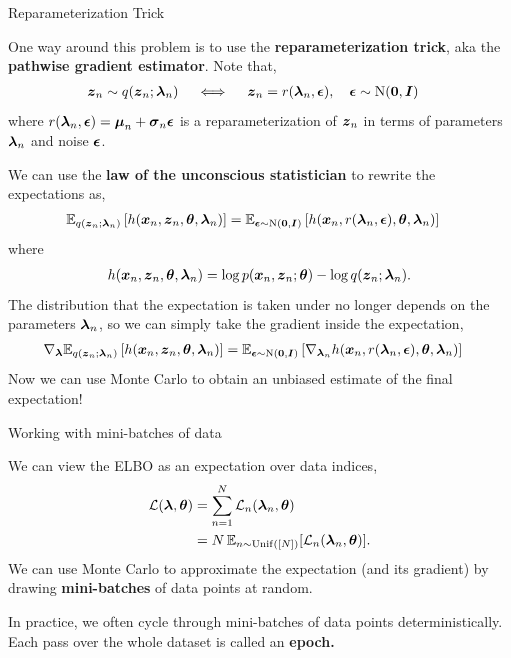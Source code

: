 \documentclass[aspectratio=169]{beamer}
\begin{document}
\begin{frame}[t,allowframebreaks]{Reparameterization Trick}\label{reparameterization-trick}

One way around this problem is to use the \textbf{reparameterization
trick}, aka the \textbf{pathwise gradient estimator}. Note that,
\begin{align*}
    \boldsymbol{z}_n \sim q(\boldsymbol{z}_n; \boldsymbol{\lambda}_n) \quad \iff \quad
    \boldsymbol{z}_n &= r(\boldsymbol{\lambda}_n, \boldsymbol{\epsilon}), \quad \boldsymbol{\epsilon} \sim \mathrm{N}(\boldsymbol{0}, \boldsymbol{I}) 
\end{align*} where
\(r(\boldsymbol{\lambda}_n, \boldsymbol{\epsilon}) = \boldsymbol{\mu}_n + \boldsymbol{\sigma}_n \boldsymbol{\epsilon}\) is a
reparameterization of \(\boldsymbol{z}_n\) in terms of parameters \(\boldsymbol{\lambda}_n\)
and noise \(\boldsymbol{\epsilon}\).

We can use the \textbf{law of the unconscious statistician} to rewrite
the expectations as, 
\begin{align*}
    \mathbb{E}_{q(\boldsymbol{z}_n; \boldsymbol{\lambda}_n)} \left[h(\boldsymbol{x}_n, \boldsymbol{z}_n, \boldsymbol{\theta}, \boldsymbol{\lambda}_n) \right]
    &= \mathbb{E}_{\boldsymbol{\epsilon} \sim \mathrm{N}(\boldsymbol{0}, \boldsymbol{I})} \left[h(\boldsymbol{x}_n, r(\boldsymbol{\lambda}_n, \boldsymbol{\epsilon}), \boldsymbol{\theta}, \boldsymbol{\lambda}_n) \right]
\end{align*} 
where 
\begin{align*}
h(\boldsymbol{x}_n, \boldsymbol{z}_n, \boldsymbol{\theta}, \boldsymbol{\lambda}_n) = \log p(\boldsymbol{x}_n, \boldsymbol{z}_n; \boldsymbol{\theta}) - \log q(\boldsymbol{z}_n; \boldsymbol{\lambda}_n).
\end{align*} 
The distribution that the expectation is taken under no
longer depends on the parameters \(\boldsymbol{\lambda}_n\), so we can simply take
the gradient inside the expectation, \begin{align*}
    \nabla_{\boldsymbol{\lambda}} \mathbb{E}_{q(\boldsymbol{z}_n; \boldsymbol{\lambda}_n)} \left[h(\boldsymbol{x}_n, \boldsymbol{z}_n, \boldsymbol{\theta}, \boldsymbol{\lambda}_n) \right]
    &=  \mathbb{E}_{\boldsymbol{\epsilon} \sim \mathrm{N}(\boldsymbol{0}, \boldsymbol{I})} \left[\nabla_{\boldsymbol{\lambda}_n} h(\boldsymbol{x}_n, r(\boldsymbol{\lambda}_n, \boldsymbol{\epsilon}), \boldsymbol{\theta}, \boldsymbol{\lambda}_n) \right]
\end{align*} 
Now we can use Monte Carlo to obtain an unbiased estimate
of the final expectation!
\end{frame}

\begin{frame}[t,allowframebreaks]{Working with mini-batches of
data}\label{working-with-mini-batches-of-data}

We can view the ELBO as an expectation over data indices, 
\begin{align*}
    \mathcal{L}(\boldsymbol{\lambda}, \boldsymbol{\theta}) 
    &= \sum_{n=1}^N \mathcal{L}_n(\boldsymbol{\lambda}_n, \boldsymbol{\theta}) \\
    &= N \, \mathbb{E}_{n \sim \mathrm{Unif}([N])}[\mathcal{L}_n(\boldsymbol{\lambda}_n, \boldsymbol{\theta})].
\end{align*} 
We can use Monte Carlo to approximate the expectation (and
its gradient) by drawing \textbf{mini-batches} of data points at random.

In practice, we often cycle through mini-batches of data points
deterministically. Each pass over the whole dataset is called an
\textbf{epoch.}
\end{frame}
\end{document}
